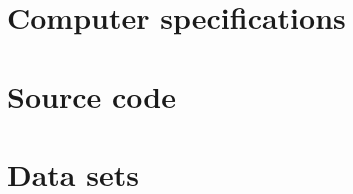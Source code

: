 \chapter{Computer specifications}
\label{computerSpecifications}


\chapter{Source code}
\label{sourceCode}


\chapter{Data sets}
\label{dataSets}

